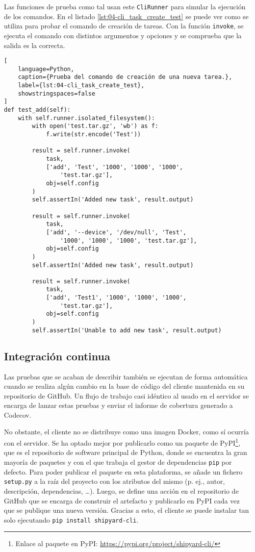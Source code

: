 Las funciones de prueba como tal usan este \texttt{CliRunner} para simular la
ejecución de los comandos. En el listado \ref{lst:04-cli_task_create_test} se
puede ver como se utiliza para probar el comando de creación de tareas. Con la
función \texttt{invoke}, se ejecuta el comando con distintos argumentos y
opciones y se comprueba que la salida es la correcta.

\begin{lstlisting}[
    language=Python,
    caption={Prueba del comando de creación de una nueva tarea.},
    label={lst:04-cli_task_create_test},
    showstringspaces=false
]
def test_add(self):
    with self.runner.isolated_filesystem():
        with open('test.tar.gz', 'wb') as f:
            f.write(str.encode('Test'))

        result = self.runner.invoke(
            task,
            ['add', 'Test', '1000', '1000', '1000',
                'test.tar.gz'],
            obj=self.config
        )
        self.assertIn('Added new task', result.output)

        result = self.runner.invoke(
            task,
            ['add', '--device', '/dev/null', 'Test',
                '1000', '1000', '1000', 'test.tar.gz'],
            obj=self.config
        )
        self.assertIn('Added new task', result.output)

        result = self.runner.invoke(
            task,
            ['add', 'Test1', '1000', '1000', '1000',
                'test.tar.gz'],
            obj=self.config
        )
        self.assertIn('Unable to add new task', result.output)
\end{lstlisting}

\subsection{Integración continua}

Las pruebas que se acaban de describir también se ejecutan de forma automática
cuando se realiza algún cambio en la base de código del cliente mantenida en su
repositorio de GitHub. Un flujo de trabajo casi idéntico al usado en el servidor
se encarga de lanzar estas pruebas y enviar el informe de cobertura generado a
Codecov.

No obstante, el cliente no se distribuye como una imagen Docker, como sí ocurría
con el servidor. Se ha optado mejor por publicarlo como un paquete de
PyPI\footnote{Enlace al paquete en PyPI:
    \url{https://pypi.org/project/shipyard-cli/}}, que es el repositorio de software
principal de Python, donde se encuentra la gran mayoría de paquetes y con el que
trabaja el gestor de dependencias \texttt{pip} por defecto. Para poder publicar
el paquete en esta plataforma, se añade un fichero \texttt{setup.py} a la raíz
del proyecto con los atributos del mismo (p. ej., autor, descripción,
dependencias, \dots). Luego, se define una acción en el repositorio de GitHub
que se encarga de construir el artefacto y publicarlo en PyPI cada vez que se
publique una nueva versión. Gracias a esto, el cliente se puede instalar tan
solo ejecutando \texttt{pip install shipyard-cli}.

